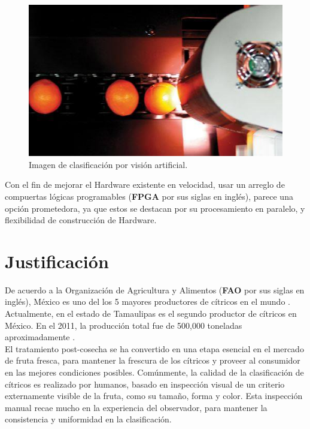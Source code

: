 \documentclass[twoside,spanish,ESP,MSc]{plantillaLabUPV}
\theoremstyle{definition}
\begin{document}
\begin{figure}[h] 
	\centering 
		\includegraphics[scale=.40]{ima/clasifAut.jpg} 
	\caption{Imagen de clasificación por visión artificial.} 
	\label{clasifAut} 
\end{figure}	
	

Con el fin de mejorar el Hardware existente en velocidad, usar un arreglo de compuertas lógicas programables (\textbf{FPGA} por sus siglas en inglés), parece una opción prometedora, ya que estos se destacan por su procesamiento en paralelo, y flexibilidad de construcción de Hardware. 




\section{Justificación}



De acuerdo a la Organización de Agricultura y Alimentos (\textbf{FAO} por sus siglas en inglés), México es uno del los 5 mayores productores de cítricos en el mundo \cite{FAO_2016}. Actualmente, en el estado de Tamaulipas es el segundo productor de cítricos en México. En el 2011, la producción total fue de 500,000 toneladas aproximadamente \cite{sag}.\\ 

El tratamiento post-cosecha se ha convertido en una etapa esencial en el mercado de fruta fresca, para mantener la frescura de los cítricos y proveer al consumidor en las mejores condiciones posibles. Comúnmente, la calidad de la clasificación de cítricos es realizado por humanos, basado en inspección visual de un criterio externamente visible de la fruta, como su tamaño, forma y color. Esta inspección manual recae mucho en la experiencia del observador, para mantener la consistencia y uniformidad en la clasificación.\\ 
\end{document}
